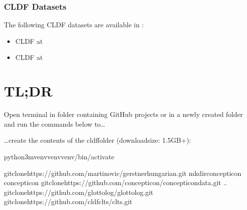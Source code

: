 \documentclass[letterpaper,10pt,english]{sphinxmanual}
\begin{document}
{{{{\subsection{CLDF Datasets}
\label{\detokenize{home:cldf-datasets}}
\sphinxAtStartPar
The following CLDF datasets are available in :
\begin{itemize}
\item {} 
\sphinxAtStartPar
CLDF
at 

\item {} 
\sphinxAtStartPar
CLDF
at 

\end{itemize}

\sphinxstepscope


\chapter{TL;DR}
\label{\detokenize{TL;DR:id1}}\label{\detokenize{TL;DR::doc}}\label{\detokenize{TL;DR:module-gerstnerhungariancommands.__init__}}
\sphinxAtStartPar
Open terminal in folder containing GitHub projects
or in a newly created folder and run the commands below to…

\sphinxAtStartPar
…create the contents of the cldf\sphinxhyphen{}folder (downloadsize: 1.5GB+):

\begin{sphinxVerbatim}[commandchars=\\\{\}]
python3\PYGZhy{}mvenvvenvvenv/bin/activate

gitclonehttps://github.com/martino\PYGZhy{}vic/gerstnerhungarian.git
mkdirconcepticon
concepticon
gitclonehttps://github.com/concepticon/concepticon\PYGZhy{}data.git
..
gitclonehttps://github.com/glottolog/glottolog.git
gitclonehttps://github.com/cldf\PYGZhy{}clts/clts.git


\end{sphinxVerbatim}}}}}
\end{document}

